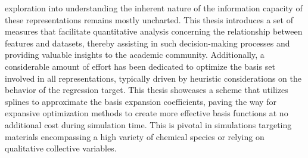 exploration into understanding the inherent nature of the information capacity
of these representations remains mostly uncharted.  This thesis introduces a
set of measures that facilitate quantitative analysis concerning the
relationship between features and datasets, thereby assisting in such
decision-making processes and providing valuable insights to the academic
community.  Additionally, a considerable amount of effort has been dedicated to
optimize the basis set involved in all representations, typically driven by
heuristic considerations on the behavior of the regression target.  This thesis
showcases a scheme that utilizes splines to approximate the basis expansion
coefficients, paving the way for expansive optimization methods to create more
effective basis functions at no additional cost during simulation time.  This
is pivotal in simulations targeting materials encompassing a high variety of
chemical species or relying on qualitative collective variables.

%
%


%


